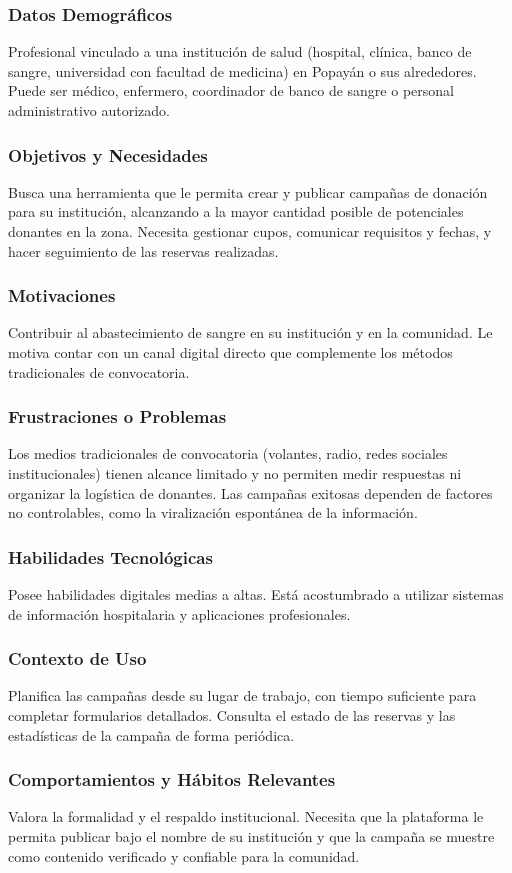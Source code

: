 \subsubsection{Datos Demográficos}
Profesional vinculado a una institución de salud (hospital, clínica, banco de sangre, universidad con facultad de medicina) en Popayán o sus alrededores. Puede ser médico, enfermero, coordinador de banco de sangre o personal administrativo autorizado.

\subsubsection{Objetivos y Necesidades}
Busca una herramienta que le permita crear y publicar campañas de donación para su institución, alcanzando a la mayor cantidad posible de potenciales donantes en la zona. Necesita gestionar cupos, comunicar requisitos y fechas, y hacer seguimiento de las reservas realizadas.

\subsubsection{Motivaciones}
Contribuir al abastecimiento de sangre en su institución y en la comunidad. Le motiva contar con un canal digital directo que complemente los métodos tradicionales de convocatoria.

\subsubsection{Frustraciones o Problemas}
Los medios tradicionales de convocatoria (volantes, radio, redes sociales institucionales) tienen alcance limitado y no permiten medir respuestas ni organizar la logística de donantes. Las campañas exitosas dependen de factores no controlables, como la viralización espontánea de la información.

\subsubsection{Habilidades Tecnológicas}
Posee habilidades digitales medias a altas. Está acostumbrado a utilizar sistemas de información hospitalaria y aplicaciones profesionales.

\subsubsection{Contexto de Uso}
Planifica las campañas desde su lugar de trabajo, con tiempo suficiente para completar formularios detallados. Consulta el estado de las reservas y las estadísticas de la campaña de forma periódica.

\subsubsection{Comportamientos y Hábitos Relevantes}
Valora la formalidad y el respaldo institucional. Necesita que la plataforma le permita publicar bajo el nombre de su institución y que la campaña se muestre como contenido verificado y confiable para la comunidad.
